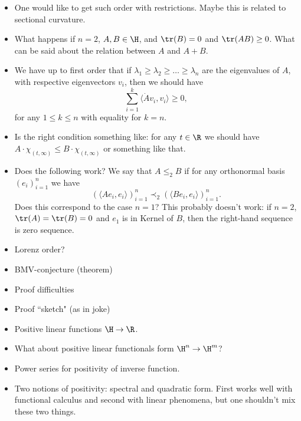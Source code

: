 \begin{itemize}
	\item One would like to get such order with restrictions. Maybe this is related to sectional curvature.
	\item What happens if $n = 2$, $A, B \in \H$, and $\tr(B) = 0$ and $\tr(AB) \geq 0$. What can be said about the relation between $A$ and $A + B$.
	\item We have up to first order that if $\lambda_{1} \geq \lambda_{2} \geq \ldots \geq \lambda_{n}$ are the eigenvalues of $A$, with respective eigenvectors $v_{i}$, then we should have
	\[
		\sum_{i = 1}^{k} \langle \dot{A} v_{i}, v_{i}\rangle \geq 0,
	\]
	for any $1 \leq k \leq n$ with equality for $k = n$.
	\item Is the right condition something like: for any $t \in \R$ we should have $A \cdot \chi_{(t, \infty)} \leq B \cdot \chi_{(t, \infty)}$ or something like that.
	\item Does the following work? We say that $A \leq_{2} B$ if for any orthonormal basis $(e_{i})_{i = 1}^{n}$ we have
	\[
		(\langle A e_{i}, e_{i} \rangle)_{i = 1}^{n} \prec_{2} (\langle B e_{i}, e_{i} \rangle)_{i = 1}^{n}.
	\]
	Does this correspond to the case $n = 1$? This probably doesn't work: if $n = 2$, $\tr(A) = \tr(B) = 0$ and $e_{1}$ is in Kernel of $B$, then the right-hand sequence is zero sequence.
	\item Lorenz order?
	\item BMV-conjecture (theorem)
	\item Proof difficulties
	\item Proof ``sketch" (as in joke)
	\item Positive linear functions $\H \to \R$.
	\item What about positive linear functionals form $\H^{n} \to \H^{m}$?
	\item Power series for positivity of inverse function.
	\item Two notions of positivity: spectral and quadratic form. First works well with functional calculus and second with linear phenomena, but one shouldn't mix these two things.
\end{itemize}




